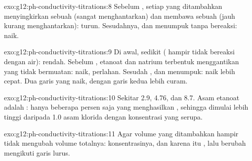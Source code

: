 \begin{solution}{exo:g12:ph-conductivity-titrations:8}
Sebelum , setiap  yang ditambahkan menyingkirkan
sebuah  (sangat menghantarkan) dan membawa sebuah 
(jauh kurang menghantarkan):  turun. Sesudahnya,
 dan  menumpuk tanpa bereaksi:  naik.
\end{solution}

\begin{solution}{exo:g12:ph-conductivity-titrations:9}
Di awal,  sedikit ( hampir tidak bereaksi dengan air):
 rendah. Sebelum ,  etanoat dan 
natrium terbentuk menggantikan  yang tidak bermuatan:
 naik, perlahan. Sesudah ,  dan
 menumpuk:  naik lebih cepat. Dua garis yang
naik, dengan garis kedua lebih curam.
\end{solution}

\begin{solution}{exo:g12:ph-conductivity-titrations:10}
Sekitar 2.9, 4.76, dan 8.7. Asam etanoat adalah : hanya
beberapa persen saja yang menghasilkan , sehingga 
dimulai lebih tinggi daripada  1.0 asam klorida dengan konsentrasi
yang serupa.
\end{solution}

\begin{solution}{exo:g12:ph-conductivity-titrations:11}
Agar volume  yang ditambahkan hampir tidak mengubah volume
totalnya: konsentrasinya, dan karena itu , lalu berubah
mengikuti garis lurus.
\end{solution}


